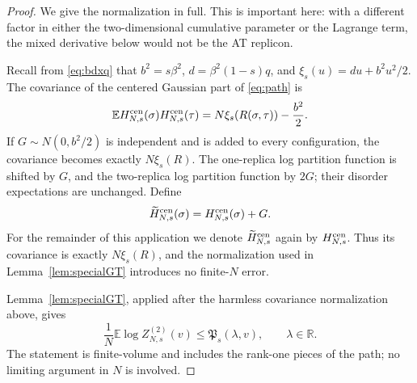 \documentclass[11pt]{article}
\numberwithin{equation}{section}
\theoremstyle{plain}
\theoremstyle{definition}
\newcommand{\E}{\mathbb E}
\newcommand{\1}{\mathbf 1}
\begin{document}
\begin{proof}
We give the normalization in full.  This is important here: with a
different factor in either the two-dimensional cumulative parameter
or the Lagrange term, the mixed derivative below would not be the AT
replicon.

Recall from \eqref{eq:bdxq} that
$b^2=s\beta^2$, $d=\beta^2(1-s)q$, and
$\xi_s(u)=du+b^2u^2/2$.
The covariance of the centered Gaussian part of \eqref{eq:path} is
\begin{equation}
 \E H_{N,s}^{\rm cen}(\sigma)H_{N,s}^{\rm cen}(\tau)
 =N\xi_s(R(\sigma,\tau))-\frac{b^2}{2}.
 \label{eq:GTcovariance}
\end{equation}
If $G\sim N(0,b^2/2)$ is independent and is added to every
configuration, the covariance becomes exactly $N\xi_s(R)$.  The
one-replica log partition function is shifted by $G$, and the
two-replica log partition function by $2G$; their disorder
expectations are unchanged.  Define
\[
 \widetilde H_{N,s}^{\rm cen}(\sigma)
 =H_{N,s}^{\rm cen}(\sigma)+G.
\]
For the remainder of this application we denote
$\widetilde H_{N,s}^{\rm cen}$ again by $H_{N,s}^{\rm cen}$.  Thus its
covariance is exactly $N\xi_s(R)$, and the normalization used in
Lemma~\ref{lem:specialGT} introduces no finite-$N$ error.

Lemma~\ref{lem:specialGT}, applied after the harmless covariance normalization above, gives
\begin{equation}
 \frac1N\E\log Z^{(2)}_{N,s}(v)
 \le \mathfrak P_s(\lambda,v),
 \qquad \lambda\in\mathbb R.
 \label{eq:GTfunctionalbound}
\end{equation}
The statement is finite-volume and includes the rank-one pieces of the
path; no limiting argument in $N$ is involved.


\end{proof}
\end{document}
